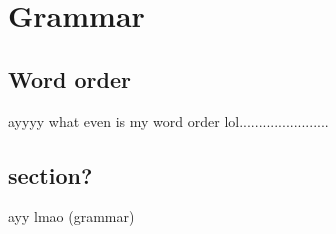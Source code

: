 \chapter{Grammar}
	
	\section{Word order}

	ayyyy 
	what even is my word order lol.......................
	\section{section?}

ayy lmao (grammar)
